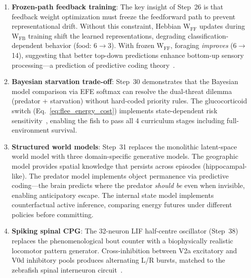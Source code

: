 \documentclass[11pt,a4paper]{article}
\begin{document}
\begin{enumerate}[nosep]
    fundamental perceptual challenge: distinguishing spatially extended
    obstacles from point-like food and enemy entities.
    This mirrors biological ``size tuning'' in tectal neurons that
    distinguish looming predators from small prey~\cite{temizer2015}.
    The improvement from 55\% to 100\% environment classification
    demonstrates that explicit spatial statistics complement raw
    pixel-level features.
  \item \textbf{Frozen-path feedback training}: The key insight of
    Step~26 is that feedback weight optimization must freeze the
    feedforward path to prevent representational drift.
    Without this constraint, Hebbian W$_\text{FF}$ updates during
    W$_\text{FB}$ training shift the learned representations, degrading
    classification-dependent behavior (food: 6$\to$3).
    With frozen W$_\text{FF}$, foraging \emph{improves} (6$\to$14),
    suggesting that better top-down predictions enhance bottom-up
    sensory processing---a prediction of predictive coding
    theory~\cite{rao1999,clark2013}.
  \item \textbf{Bayesian starvation trade-off}: Step~30 demonstrates
    that the Bayesian model comparison via EFE softmax can resolve
    the dual-threat dilemma (predator + starvation) without
    hard-coded priority rules.  The glucocorticoid switch
    (Eq.~\ref{eq:flee_energy_cost}) implements state-dependent risk
    sensitivity~\cite{lima1990}, enabling the fish to pass all 4
    curriculum stages including full-environment survival.
  \item \textbf{Structured world models}: Step~31 replaces the
    monolithic latent-space world model with three domain-specific
    generative models.  The geographic model provides spatial
    knowledge that persists across episodes (hippocampal-like).
    The predator model implements object permanence via predictive
    coding---the brain predicts where the predator \emph{should be}
    even when invisible, enabling anticipatory escape.
    The internal state model implements counterfactual active inference,
    comparing energy futures under different policies before committing.
  \item \textbf{Spiking spinal CPG}: The 32-neuron LIF half-centre oscillator
    (Step~38) replaces the phenomenological bout counter with a biophysically
    realistic locomotor pattern generator.  Cross-inhibition between V2a
    excitatory and V0d inhibitory pools produces alternating L/R bursts,
    matched to the zebrafish spinal interneuron circuit~\cite{bhatt2009}.

\end{enumerate}
\end{document}
